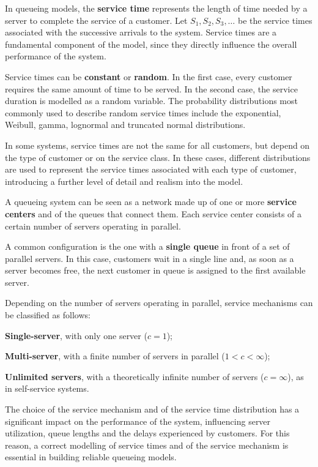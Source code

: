 In queueing models, the \textbf{service time} represents the length of time needed by a server to complete the service of a customer. Let $S_1, S_2, S_3, \dots$ be the service times associated with the successive arrivals to the system. Service times are a fundamental component of the model, since they directly influence the overall performance of the system.

Service times can be \textbf{constant} or \textbf{random}. In the first case, every customer requires the same amount of time to be served. In the second case, the service duration is modelled as a random variable. The probability distributions most commonly used to describe random service times include the exponential, Weibull, gamma, lognormal and truncated normal distributions.

In some systems, service times are not the same for all customers, but depend on the type of customer or on the service class. In these cases, different distributions are used to represent the service times associated with each type of customer, introducing a further level of detail and realism into the model.

A queueing system can be seen as a network made up of one or more \textbf{service centers} and of the queues that connect them. Each service center consists of a certain number of servers operating in parallel.

A common configuration is the one with a \textbf{single queue} in front of a set of parallel servers. In this case, customers wait in a single line and, as soon as a server becomes free, the next customer in queue is assigned to the first available server.

Depending on the number of servers operating in parallel, service mechanisms can be classified as follows:
\begin{compactitemize}
    \item \textbf{Single-server}, with only one server ($c = 1$);
    \item \textbf{Multi-server}, with a finite number of servers in parallel ($1 < c < \infty$);
    \item \textbf{Unlimited servers}, with a theoretically infinite number of servers ($c = \infty$), as in self-service systems.
\end{compactitemize}

The choice of the service mechanism and of the service time distribution has a significant impact on the performance of the system, influencing server utilization, queue lengths and the delays experienced by customers. For this reason, a correct modelling of service times and of the service mechanism is essential in building reliable queueing models.


